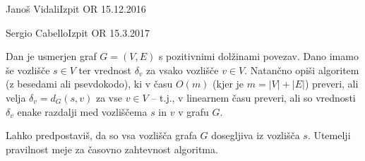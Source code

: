 \begin{naloga}{Janoš Vidali}{Izpit OR 15.12.2016}
\begin{vprasanje}[zaklad]
\begin{slika}
\end{slika}
\end{vprasanje}
\begin{odgovor}
\end{odgovor}
\end{naloga}


\begin{naloga}{Sergio Cabello}{Izpit OR 15.3.2017}
\begin{vprasanje}
Dan je usmerjen graf $G = (V, E)$ s pozitivnimi dolžinami povezav.
Dano imamo še vozlišče $s \in V$
ter vrednost $\delta_v$ za vsako vozlišče $v \in V$.
Natančno opiši algoritem (z besedami ali psevdokodo),
ki v času $O(m)$ (kjer je $m = |V| + |E|$) preveri,
ali velja $\delta_v = d_G(s, v)$ za vse $v \in V$
-- t.j., v linearnem času preveri,
ali so vrednosti $\delta_v$
enake razdalji med vozliščema $s$ in $v$ v grafu $G$.

Lahko predpostaviš, da so vsa vozlišča grafa $G$ dosegljiva iz vozlišča $s$.
Utemelji pravilnost meje za časovno zahtevnost algoritma.
\end{vprasanje}
\begin{odgovor}
\end{odgovor}
\end{naloga}


